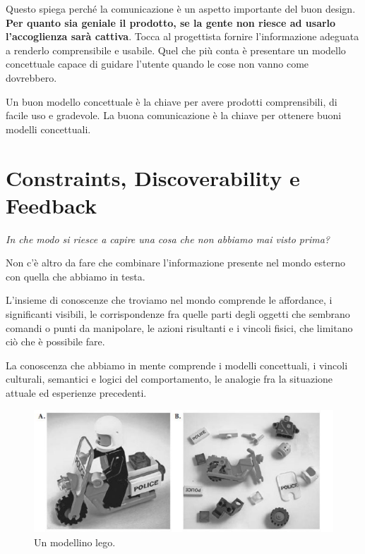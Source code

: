 \documentclass[a4paper,11pt,oneside]{book}
\begin{document}
Questo spiega perché la comunicazione è un aspetto importante del buon design.\textbf{ Per quanto sia geniale il prodotto, se la gente non riesce ad usarlo l'accoglienza sarà cattiva}. Tocca al progettista fornire l'informazione adeguata a renderlo comprensibile e usabile. Quel che più conta è presentare un modello concettuale capace di guidare l'utente quando le cose non vanno come dovrebbero.

Un buon modello concettuale è la chiave per avere prodotti comprensibili, di facile uso e gradevole. La buona comunicazione è la chiave per ottenere buoni modelli concettuali.

\pagebreak


\chapter{Constraints, Discoverability e Feedback}
\begin{flushleft}
	\textit{In che modo si riesce a capire una cosa che non abbiamo mai visto prima?}
\end{flushleft}

Non c'è altro da fare che combinare l'informazione presente nel mondo esterno con quella che abbiamo in testa.

L'insieme di conoscenze che troviamo nel mondo comprende le affordance, i significanti visibili, le corrispondenze fra quelle parti degli oggetti che sembrano comandi o punti da manipolare, le azioni risultanti e i vincoli fisici, che limitano ciò che è possibile fare.

La conoscenza che abbiamo in mente comprende i modelli concettuali, i vincoli culturali, semantici e logici del comportamento, le analogie fra la situazione attuale ed esperienze precedenti.

\begin{figure}[!h]
	\centering
	\includegraphics[scale = 0.7]{"immagini/Modellino Lego"}
	\caption{Un modellino lego.}
\end{figure}
\end{document}
